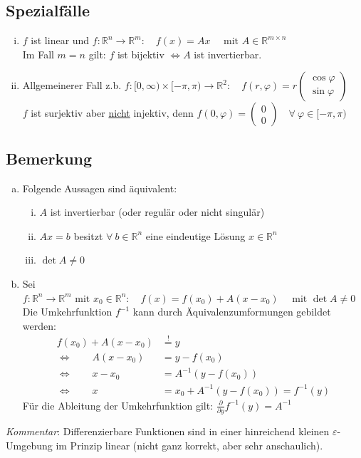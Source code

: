 \documentclass[11pt,a4paper]{book}
\newcommand {\R}	{\mathbb{R}}
\newcommand {\Rn}	{\mathbb{R}^n}
\newcommand {\Rm}	{\mathbb{R}^m}
\newcommand {\Rmxn}	{\mathbb{R}^{m \times n}}
\newcommand{\1}    	{\mathbbm{1}}
\newcommand{\mitt}	{\textrm{ mit }}
\begin{document}
\subsection{Spezialfälle}
\begin{enumerate}[(i)]
	\item \(f\) ist linear und \(f: \Rn \rightarrow \Rm : \quad f(x) = Ax \quad\mitt A \in \Rmxn\) \\
	Im Fall \(m=n\) gilt: \(f\) ist bijektiv \(\Leftrightarrow A\) ist invertierbar.
	\item Allgemeinerer Fall z.b. \(f: [0,\infty) \times [-\pi,\pi) \rightarrow \R^2 : \quad f(r,\varphi) = r \left( \begin{array}{c}
		\cos \varphi \\
		\sin \varphi
	\end{array} \right) \) \\
	\(f\) ist surjektiv aber \underline{nicht} injektiv, denn \( f(0,\varphi) = \left(\begin{array}{c}
		0 \\ 0
	\end{array}\right) \quad \forall~ \varphi \in [-\pi,\pi)\)
\end{enumerate}

\subsection{Bemerkung}
\begin{enumerate}[a.~]
	\item Folgende Aussagen sind äquivalent:
	\begin{enumerate}[(i)]
		\item \(A\) ist invertierbar (oder regulär oder nicht singulär)
		\item \(Ax = b\) besitzt \(\forall~ b \in \Rn\) eine eindeutige Lösung \(x \in \Rn\)
		\item \(\det A \neq 0\)
	\end{enumerate}
	\item Sei \(f:\Rn \rightarrow \Rm \mitt x_0 \in \Rn: \quad f(x) = f(x_0) + A(x - x_0) \quad\mitt \det A \neq 0\)\\
	Die Umkehrfunktion \(f^{-1}\) kann durch 	Äquivalenzumformungen gebildet werden:
	\begin{align*}
		f(x_0) + A(x-x_0) &\stackrel{!}{=} y \\
		\Leftrightarrow\qquad A(x-x_0) &= y - f(x_0) \\
		\Leftrightarrow\qquad x-x_0 &= A^{-1}(y - f(x_0)) \\
		\Leftrightarrow\qquad x &= x_0 + A^{-1}(y - f(x_0)) = f^{-1}(y)
	\end{align*}
	Für die Ableitung der Umkehrfunktion gilt: \(\frac{\partial}{\partial y} f^{-1}(y) = A^{-1}\)
\end{enumerate}
\textit{Kommentar}: Differenzierbare Funktionen sind in einer hinreichend kleinen \(\varepsilon\)-Umgebung im Prinzip linear (nicht ganz korrekt, aber sehr anschaulich).
\end{document}
